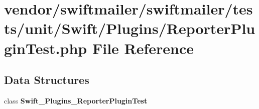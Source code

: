 \section{vendor/swiftmailer/swiftmailer/tests/unit/\+Swift/\+Plugins/\+Reporter\+Plugin\+Test.php File Reference}
\label{_reporter_plugin_test_8php}
\subsection*{Data Structures}
\begin{DoxyCompactItemize}
\item 
class {\bf Swift\+\_\+\+Plugins\+\_\+\+Reporter\+Plugin\+Test}
\end{DoxyCompactItemize}
